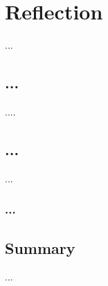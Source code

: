 \chapter{Reflection}
\label{ch:lit_rev}

...
\section{...}
....


\section{...}
...


\subsection{...}


\section{Summary}
...


